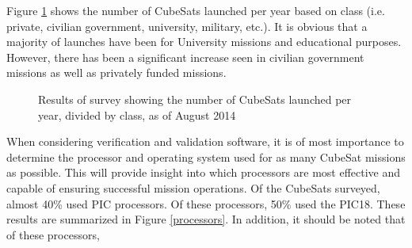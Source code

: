 \documentclass[11pt]{article}
\begin{document}
Figure \ref{classperyear} shows the number of CubeSats launched per year based on class (i.e. private, civilian government, university, military, etc.).  It is obvious that a majority of launches have been for University missions and educational purposes.  However, there has been a significant increase seen in civilian government missions as well as privately funded missions.  

\begin{figure}[ht!]
\centering
{}
\caption{Results of survey showing the number of CubeSats launched per year, divided by class, as of August 2014}
\label{classperyear}
\end{figure}

When considering verification and validation software, it is of most importance to determine the processor and operating system used for as many CubeSat missions as possible.  This will provide insight into which processors are most effective and capable of ensuring successful mission operations.  Of the CubeSats surveyed, almost 40\% used PIC processors.  Of these processors, 50\% used the PIC18.  These results are summarized in Figure \ref{processors}.  In addition, it should be noted that of these processors, 
\end{document}
